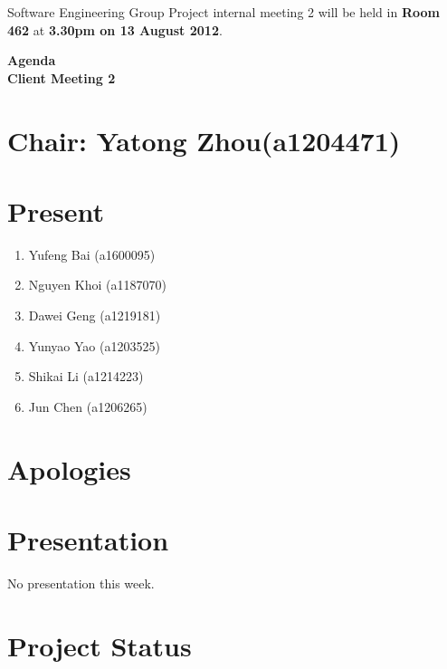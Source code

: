 \documentclass[11pt, a4paper]{article}
\begin{document}
\noindent Software Engineering Group Project internal meeting 2 will be held in {\bf Room 462} at {\bf 3.30pm on 13 August 2012}.


\vspace*{15pt}

\begin{center}
\huge \bf Agenda \\Client Meeting 2
\end{center}



\section*{Chair: Yatong Zhou(a1204471)}
\section*{Present}
\begin{enumerate}
\item Yufeng Bai (a1600095)
\item Nguyen Khoi (a1187070)
\item Dawei Geng (a1219181)
\item Yunyao Yao (a1203525)
\item Shikai Li (a1214223)
\item Jun Chen (a1206265)
\end{enumerate}
\section{Apologies}

\section{Presentation}
No presentation this week. 

\section{Project Status}
\end{document}

